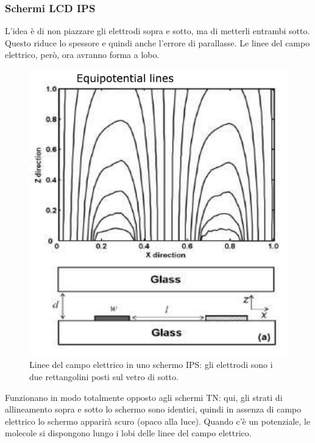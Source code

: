 \documentclass[a4paper,11pt]{article}
\begin{document}
\subsubsection{Schermi LCD IPS}
L'idea è di non piazzare gli elettrodi sopra e sotto, ma di metterli entrambi sotto. Questo riduce lo spessore
e quindi anche l'errore di parallasse. Le linee del campo elettrico, però, ora avranno forma a lobo.

\newpage
\renewcommand{\thefigure}{4.7}
\begin{figure}[!h]
  \centering
    \includegraphics[scale=0.4]{images/4/ips_field.png}
    \caption{Linee del campo elettrico in uno schermo IPS: gli elettrodi sono i due rettangolini posti sul vetro di sotto.}
\end{figure}

Funzionano in modo totalmente opposto agli schermi TN: qui, gli strati di allineamento sopra e sotto lo schermo
sono identici, quindi in assenza di campo elettrico lo schermo apparirà scuro (opaco alla luce).
Quando c'è un potenziale, le molecole si dispongono lungo i lobi delle linee del campo elettrico.
\end{document}
